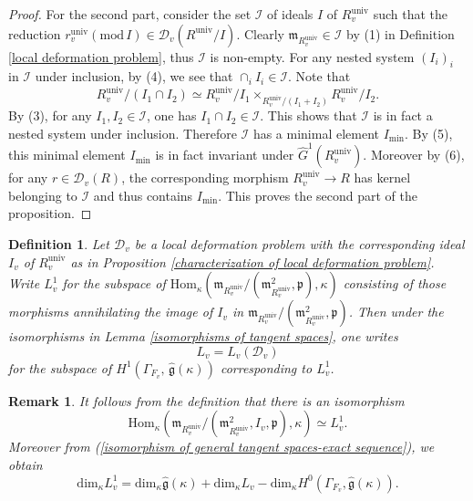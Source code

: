 \documentclass[12pt,oneside,reqno]{amsart}
\theoremstyle{plain}
\newtheorem{definition}[theorem]{Definition}
\newtheorem{remark}[theorem]{Remark}
\begin{document}
\begin{proof}
		
		
		
		For the second part,
		consider the set
		$\mathcal{I}$
		of ideals $I$ of
		$R^\mathrm{univ}_v$
		such that
		the reduction
		$r^\mathrm{univ}_v(\mathrm{mod}\,I)
		\in
		\mathcal{D}_v(R^\mathrm{univ}/I)$.
		Clearly
		$\mathfrak{m}_{R^\mathrm{univ}_v}
		\in
		\mathcal{I}$ by (1) in Definition \ref{local deformation problem},
		thus
		$\mathcal{I}$ is non-empty.
		For any nested system
		$(I_i)_i$ in $\mathcal{I}$ under inclusion,
		by (4),
		we see that
		$\cap_iI_i\in\mathcal{I}$.
		Note that
		\[
		R_v^{\mathrm{univ}}/(I_1\cap I_2)
		\simeq
		R_v^{\mathrm{univ}}/I_1
		\times_{R_v^{\mathrm{univ}}/(I_1+I_2)}
		R_v^{\mathrm{univ}}/I_2.
		\]
		By (3), for any
		$I_1,I_2\in\mathcal{I}$,
		one has $I_1\cap I_2\in\mathcal{I}$.
		This shows that $\mathcal{I}$
		is in fact a nested system under inclusion.
		Therefore $\mathcal{I}$
		has a minimal element
		$I_\mathrm{min}$.
		By (5), this minimal element
		$I_\mathrm{min}$
		is in fact invariant under
		$\widehat{G}^1(R^\mathrm{univ}_v)$.
		Moreover by (6),
		for any
		$r\in\mathcal{D}_v(R)$,
		the corresponding morphism
		$R^\mathrm{univ}_v
		\rightarrow
		R$ has kernel belonging to
		$\mathcal{I}$
		and thus contains $I_\mathrm{min}$.
		This proves the second part of the proposition.
	\end{proof}
	
	
	
	
	
	\begin{definition}\label{L_v}
		Let $\mathcal{D}_v$ be a local deformation problem
		with the corresponding ideal
		$I_v$ of $R^\mathrm{univ}_v$ as in
		Proposition
		\ref{characterization of local deformation problem}.
		Write
		$L_v^1$
		for the subspace of
		$\mathrm{Hom}_\kappa
		(\mathfrak{m}_{R^\mathrm{univ}_v}
		/(\mathfrak{m}_{R^\mathrm{univ}_v}^2,\mathfrak{p}),\kappa)$
		consisting of those morphisms annihilating
		the image of $I_v$ in $\mathfrak{m}_{R^\mathrm{univ}_v}
		/(\mathfrak{m}_{R^\mathrm{univ}_v}^2,\mathfrak{p})$.
		Then under the isomorphisms in
		Lemma \ref{isomorphisms of tangent spaces},
		one writes
		\[
		L_v=L_v(\mathcal{D}_v)
		\]
		for the subspace of
		$H^1(\Gamma_{F_v},\,
		\widehat{\mathfrak{g}}(\kappa))$
		corresponding to $L_v^1$.
	\end{definition}
	
	\begin{remark}\label{dimension formula for L_v1}\rm 
		It follows from the definition that
		there is an isomorphism
		\[
		\mathrm{Hom}_\kappa
		(\mathfrak{m}_{R^\mathrm{univ}_v}/
		(\mathfrak{m}_{R^\mathrm{univ}_v}^2,I_v,\mathfrak{p}),\kappa
		)
		\simeq
		L_v^1.
		\]
		Moreover from (\ref{isomorphism of general tangent spaces-exact sequence}),
		we obtain
		\[
		\mathrm{dim}_\kappa L_v^1
		=
		\mathrm{dim}_\kappa
		\widehat{\mathfrak{g}}(\kappa)
		+
		\mathrm{dim}_\kappa L_v
		-
		\mathrm{dim}_\kappa
		H^0
		(\Gamma_{F_v},\widehat{\mathfrak{g}}(\kappa)).
		\]
		
	\end{remark}
	
\end{document}
